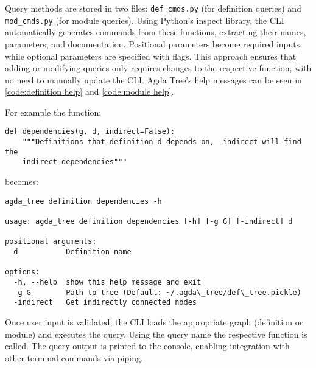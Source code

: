 Query methods are stored in two files: \texttt{def\_cmds.py} (for definition
queries) and \texttt{mod\_cmds.py} (for module queries). Using Python’s inspect
library, the CLI automatically generates commands from these functions,
extracting their names, parameters, and documentation. Positional parameters
become required inputs, while optional parameters are specified with flags.
This approach ensures that adding or modifying queries only requires changes to
the respective function, with no need to manually update the CLI. Agda Tree's
help messages can be seen in \cref{code:definition help} and \cref{code:module
help}.

For example the function:

\begin{lstlisting}
def dependencies(g, d, indirect=False):
    """Definitions that definition d depends on, -indirect will find the
    indirect dependencies"""
\end{lstlisting}

becomes:

\begin{lstlisting}
agda_tree definition dependencies -h

usage: agda_tree definition dependencies [-h] [-g G] [-indirect] d

positional arguments:
  d           Definition name

options:
  -h, --help  show this help message and exit
  -g G        Path to tree (Default: ~/.agda\_tree/def\_tree.pickle)
  -indirect   Get indirectly connected nodes
\end{lstlisting}

Once user input is validated, the CLI loads the appropriate graph (definition
or module) and executes the query. Using the query name the respective function
is called. The query output is printed to the console, enabling integration
with other terminal commands via piping.


